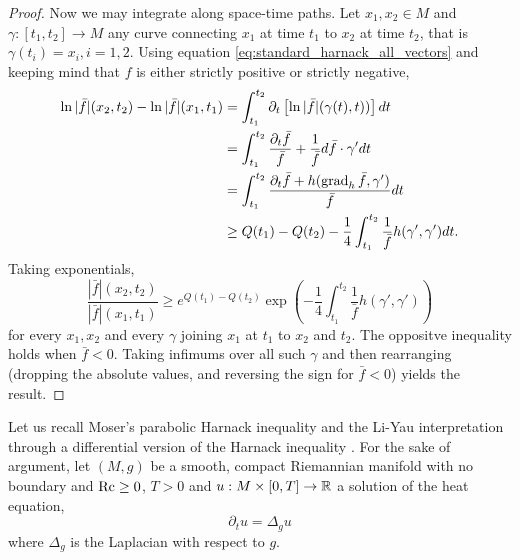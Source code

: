 \begin{proof}
Now we may integrate along space-time paths. Let $x_1,x_2 \in M$ and $\gamma : [t_1, t_2] \to M$ any curve connecting $x_1$ at time $t_1$ to $x_2$ at time $t_2$, that is $\gamma(t_i) = x_i, i = 1,2$. Using equation \eqref{eq:standard_harnack_all_vectors} and keeping mind that $f$ is either strictly positive or strictly negative,
\[
\begin{split}
\ln |\bar{f}| (x_2, t_2) - \ln |\bar{f}| (x_1, t_1) &= \int_{t_1}^{t_2} \partial_t \left[\ln |\bar{f}| (\gamma(t), t))\right] dt \\
&= \int_{t_1}^{t_2} \frac{\partial_t \bar{f}}{\bar{f}} + \frac{1}{\bar{f}} d\bar{f} \cdot \gamma' dt \\
&= \int_{t_1}^{t_2} \frac{\partial_t \bar{f} + h (\operatorname{grad}_h \bar{f}, \gamma')}{\bar{f}} dt \\
&\geq Q(t_1) - Q(t_2) - \frac{1}{4} \int_{t_1}^{t_2} \frac{1}{\bar{f}} h(\gamma', \gamma') dt.
\end{split}
\]
Taking exponentials,
\[
\frac{|\bar{f}| (x_2, t_2)}{|\bar{f}| (x_1, t_1)} \geq e^{Q(t_1) - Q(t_2)} \exp\left(- \frac{1}{4} \int_{t_1}^{t_2} \frac{1}{\bar{f}} h(\gamma', \gamma')\right)
\]
for every $x_1, x_2$ and every $\gamma$ joining $x_1$ at $t_1$ to $x_2$ and $t_2$. The oppositve inequality holds when $\bar{f} < 0$. Taking infimums over all such $\gamma$ and then rearranging (dropping the absolute values, and reversing the sign for $\bar{f} < 0$) yields the result.
\end{proof}

Let us recall Moser's parabolic Harnack inequality \cite{Moser:02/1964} and the Li-Yau interpretation through a differential version of the Harnack inequality \cite{LiYau:/1986}. For the sake of argument, let $(M, g)$ be a smooth, compact Riemannian manifold with no boundary and $\operatorname{Rc} \geq 0$, $T > 0$ and $u : M \times [0, T] \to \mathbb{R}$ a solution of the heat equation,
\[
\partial_t u = \Delta_g u
\]
where $\Delta_g$ is the Laplacian with respect to $g$.

